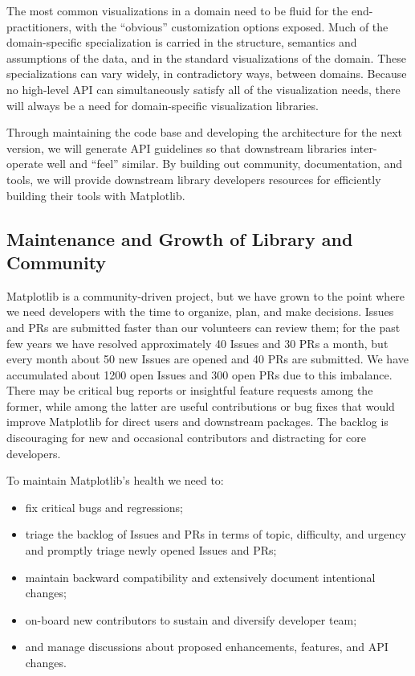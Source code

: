 \documentclass[11pt,letterpaper]{article}  %
\begin{document}
The most common visualizations in a domain need to be fluid for
the end-practitioners, with the ``obvious'' customization options
exposed. Much of the domain-specific specialization is carried in the
structure, semantics and assumptions of the data, and in the standard
visualizations of the domain. These specializations can vary widely,
in contradictory ways, between domains. Because no high-level API can
simultaneously satisfy all of the visualization needs, there will
always be a need for domain-specific visualization libraries.

Through maintaining the code base and developing the architecture for
the next version, we will generate API guidelines so that downstream
libraries inter-operate well and ``feel'' similar. By building out
community, documentation, and tools, we will provide downstream
library developers resources for efficiently building their tools with
Matplotlib.

\subsection{Maintenance and Growth of Library and Community}

Matplotlib is a community-driven project, but we have grown to the
point where we need developers with the time to organize, plan, and
make decisions. Issues and PRs are submitted faster than our
volunteers can review them; for the past few years we have resolved
approximately 40 Issues and 30 PRs a month, but every month about 50
new Issues are opened and 40 PRs are submitted.  We have accumulated
about 1200 open Issues and 300 open PRs due to this imbalance. There
may be critical bug reports or insightful feature requests among the
former, while among the latter are useful contributions or bug fixes
that would improve Matplotlib for direct users and downstream
packages. The backlog is discouraging for new and occasional
contributors and distracting for core developers.

To maintain Matplotlib's health we need to:
\begin{itemize}[noitemsep]
\item fix critical bugs and regressions;
\item triage the backlog of Issues and PRs in terms of topic, difficulty, and urgency and promptly triage newly opened Issues and PRs;
\item maintain backward compatibility and extensively document intentional changes;
\item on-board new contributors to sustain and diversify developer team;
\item and manage discussions about proposed enhancements, features, and API changes.
\end{itemize}
\end{document}

